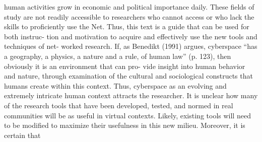\documentclass [10pt,a4paper]{book}
\begin{document}
human activities grow in economic and political importance daily. These fields of
study are not readily accessible to researchers who cannot access or who lack the skills
to proficiently use the Net. Thus, this text is a guide that can be used for both instruc-
tion and motivation to acquire and effectively use the new tools and techniques of net-
worked research.
If, as Benedikt (1991) argues, cyberspace “has a geography, a physics, a nature
and a rule, of human law” (p. 123), then obviously it is an environment that can pro-
vide insight into human behavior and nature, through examination of the cultural and
sociological constructs that humans create within this context. Thus, cyberspace as an
evolving and extremely intricate human context attracts the researcher. It is unclear
how many of the research tools that have been developed, tested, and normed in real
communities will be as useful in virtual contexts. Likely, existing tools will need to be
modified to maximize their usefulness in this new milieu. Moreover, it is certain that
\end{document}
